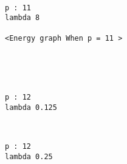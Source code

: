\documentclass[11pt]{article}
\begin{document}
    \begin{center}
    \end{center}
    { \hspace*{\fill} \\}
    
    \begin{Verbatim}[commandchars=\\\{\}]
p : 11
lambda 8

<Energy graph When p = 11 >

    \end{Verbatim}

    \begin{center}
    \end{center}
    { \hspace*{\fill} \\}
    
    \begin{center}
    \end{center}
    { \hspace*{\fill} \\}
    
    \begin{Verbatim}[commandchars=\\\{\}]
p : 12
lambda 0.125

    \end{Verbatim}

    \begin{center}
    \end{center}
    { \hspace*{\fill} \\}
    
    \begin{Verbatim}[commandchars=\\\{\}]
p : 12
lambda 0.25

    \end{Verbatim}

    \begin{center}
    \end{center}
    { \hspace*{\fill} \\}
    
\end{document}
